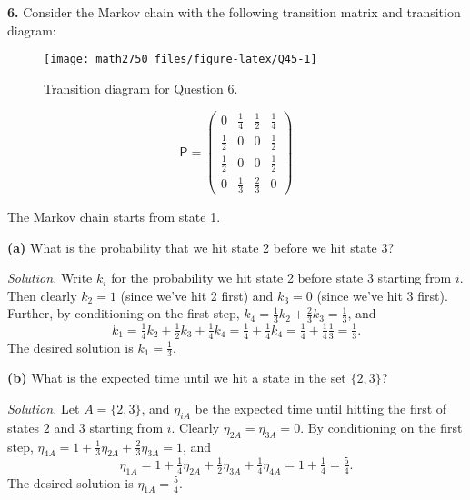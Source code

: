 \documentclass[
  a4paper,
]{article}
\theoremstyle{definition}
\theoremstyle{definition}
\theoremstyle{definition}
\theoremstyle{remark}
\begin{document}
\textbf{6.} Consider the Markov chain with the following transition matrix and transition diagram:

\begin{figure}

{\centering \texttt{[image: math2750\_files/figure-latex/Q45-1]} 

}

\caption{Transition diagram for Question 6.}\label{fig:Q45}
\end{figure}

\[ \mathsf P = \begin{pmatrix} 0 & \frac14 & \frac12 & \frac14 \\
               \frac12 & 0& 0& \frac12 \\
               \frac12 & 0& 0& \frac12 \\
               0 & \frac13 & \frac23 & 0 \end{pmatrix} \]

The Markov chain starts from state 1.

\textbf{(a)} What is the probability that we hit state 2 before we hit state 3?

\begin{myanswers}

\emph{Solution.} Write \(k_i\) for the probability we hit state 2 before state 3 starting from \(i\). Then clearly \(k_2 = 1\) (since we've hit 2 first) and \(k_3 = 0\) (since we've hit 3 first). Further, by conditioning on the first step, \(k_4 = \frac13 k_2 + \frac23 k_3 = \frac13\), and
\[ k_1 = \tfrac14 k_2 + \tfrac12k_3 + \tfrac14 k_4   = \tfrac14 + \tfrac14 k_4 = \tfrac14 + \tfrac14\tfrac13 = \tfrac13 . \]
The desired solution is \(k_1 = \frac13\).

\end{myanswers}

\textbf{(b)} What is the expected time until we hit a state in the set \(\{2,3\}\)?

\begin{myanswers}

\emph{Solution.} Let \(A = \{2,3\}\), and \(\eta_{iA}\) be the expected time until hitting the first of states \(2\) and \(3\) starting from \(i\). Clearly \(\eta_{2A} = \eta_{3A} = 0\). By conditioning on the first step, \(\eta_{4A} = 1+ \frac13 \eta_{2A} + \frac23 \eta_{3A} = 1\), and
\[ \eta_{1A} = 1 + \tfrac14 \eta_{2A} + \tfrac12\eta_{3A} + \tfrac14 \eta_{4A} = 1 + \tfrac14 = \tfrac54 .        \]
The desired solution is \(\eta_{1A} = \tfrac54\).

\end{myanswers}
\end{document}
